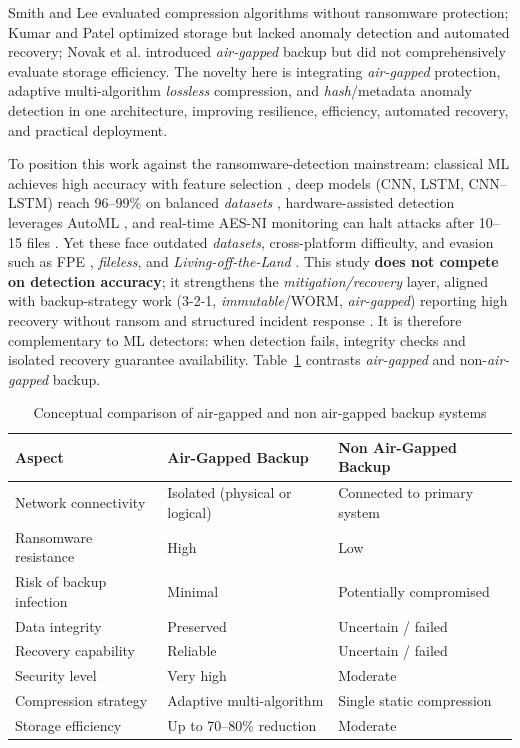 \documentclass{iaesarticle}
\begin{document}
Smith and Lee evaluated compression algorithms without ransomware protection; Kumar and Patel optimized storage but lacked anomaly detection and automated recovery; Novak et al. introduced \textit{air-gapped} backup but did not comprehensively evaluate storage efficiency. The novelty here is integrating \textit{air-gapped} protection, adaptive multi-algorithm \textit{lossless} compression, and \textit{hash}/metadata anomaly detection in one architecture, improving resilience, efficiency, automated recovery, and practical deployment.

To position this work against the ransomware-detection mainstream: classical ML achieves high accuracy with feature selection \cite{31}, deep models (CNN, LSTM, CNN--LSTM) reach 96--99\% on balanced \textit{datasets} \cite{30}, hardware-assisted detection leverages AutoML \cite{34}, and real-time AES-NI monitoring can halt attacks after 10--15 files \cite{32}. Yet these face outdated \textit{datasets}, cross-platform difficulty, and evasion such as FPE \cite{43}, \textit{fileless}, and \textit{Living-off-the-Land} \cite{35}. This study \textbf{does not compete on detection accuracy}; it strengthens the \textit{mitigation/recovery} layer, aligned with backup-strategy work (3-2-1, \textit{immutable}/WORM, \textit{air-gapped}) reporting high recovery without ransom \cite{44} and structured incident response \cite{45}. It is therefore complementary to ML detectors: when detection fails, integrity checks and isolated recovery guarantee availability. Table~\ref{tab:airgap_comparison} contrasts \textit{air-gapped} and non-\textit{air-gapped} backup.

\begin{table}[H]
\centering
\fontsize{8pt}{10pt}\selectfont
\caption{Conceptual comparison of air-gapped and non air-gapped backup systems}
\label{tab:airgap_comparison}
\begin{tabularx}{\textwidth}{@{}p{3.2cm} X X@{}}
\hline
\textbf{Aspect} & \textbf{Air-Gapped Backup} & \textbf{Non Air-Gapped Backup} \\
\hline
Network connectivity & Isolated (physical or logical) & Connected to primary system \\
Ransomware resistance & High & Low \\
Risk of backup infection & Minimal & Potentially compromised \\
Data integrity & Preserved & Uncertain / failed \\
Recovery capability & Reliable & Uncertain / failed \\
Security level & Very high & Moderate \\
Compression strategy & Adaptive multi-algorithm & Single static compression \\
Storage efficiency & Up to 70--80\% reduction & Moderate \\
\hline
\end{tabularx}
\end{table}
\end{document}
